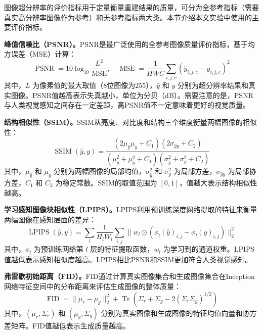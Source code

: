 图像超分辨率的评价指标用于定量衡量重建结果的质量，可分为全参考指标（需要真实高分辨率图像作为参考）和无参考指标两大类。本节介绍本文实验中使用的主要评价指标。

\textbf{峰值信噪比（PSNR）。}PSNR是最广泛使用的全参考图像质量评价指标，基于均方误差（MSE）计算：
\begin{equation}
  \operatorname{PSNR} = 10\log_{10}\frac{L^2}{\operatorname{MSE}}, \quad \operatorname{MSE} = \frac{1}{HWC}\sum_{i,j,c}(\hat{y}_{i,j,c} - y_{i,j,c})^2
  \label{eq:psnr}
\end{equation}
其中，$L$ 为像素值的最大取值（8位图像为255），$\hat{y}$ 和 $y$ 分别为超分辨率结果和真实图像。PSNR值越高表示失真越小，单位为分贝（dB）。需要注意的是，PSNR与人类视觉感知之间存在一定差距，高PSNR值不一定意味着更好的视觉质量。

\textbf{结构相似性（SSIM）。}SSIM\cite{wang2004image}从亮度、对比度和结构三个维度衡量两幅图像的相似性：
\begin{equation}
  \operatorname{SSIM}(\hat{y}, y) = \frac{(2\mu_{\hat{y}}\mu_y + C_1)(2\sigma_{\hat{y}y} + C_2)}{(\mu_{\hat{y}}^2 + \mu_y^2 + C_1)(\sigma_{\hat{y}}^2 + \sigma_y^2 + C_2)}
  \label{eq:ssim}
\end{equation}
其中，$\mu_{\hat{y}}$ 和 $\mu_y$ 分别为两幅图像的局部均值，$\sigma_{\hat{y}}^2$ 和 $\sigma_y^2$ 为局部方差，$\sigma_{\hat{y}y}$ 为局部协方差，$C_1$ 和 $C_2$ 为稳定常数。SSIM的取值范围为 $[0,1]$，值越大表示结构相似性越高。

\textbf{学习感知图像块相似性（LPIPS）。}LPIPS\cite{zhang2018unreasonable}利用预训练深度网络提取的特征来衡量两幅图像在感知层面的差异：
\begin{equation}
  \operatorname{LPIPS}(\hat{y}, y) = \sum_l \frac{1}{H_l W_l}\sum_{i,j}\|w_l \odot (\phi_l(\hat{y})_{i,j} - \phi_l(y)_{i,j})\|_2^2
  \label{eq:lpips}
\end{equation}
其中，$\phi_l$ 为预训练网络第 $l$ 层的特征提取函数，$w_l$ 为学习到的通道权重。LPIPS值越低表示感知相似度越高。LPIPS相比PSNR和SSIM更加符合人类视觉感知。

\textbf{弗雷歇初始距离（FID）。}FID\cite{heusel2017gans}通过计算真实图像集合和生成图像集合在Inception网络特征空间中的分布距离来评估生成图像的整体质量：
\begin{equation}
  \operatorname{FID} = \|\mu_r - \mu_g\|_2^2 + \operatorname{Tr}(\Sigma_r + \Sigma_g - 2(\Sigma_r\Sigma_g)^{1/2})
  \label{eq:fid}
\end{equation}
其中，$(\mu_r, \Sigma_r)$ 和 $(\mu_g, \Sigma_g)$ 分别为真实图像和生成图像的特征均值向量和协方差矩阵。FID值越低表示生成质量越高。

